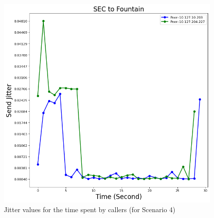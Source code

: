 	\begin{figure}[!b]
		\begin{minipage}{\textwidth}
			\includegraphics[scale=0.38]{Images/experiment/senarios/df_fountain.png}
		\end{minipage}
		\caption{Jitter values for the time spent by callers (for Scenario 4)}
		\label{fig:scene-out-4}
	\end{figure}


